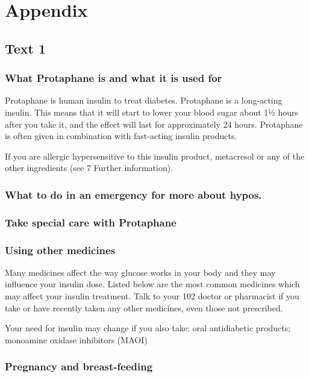 \documentclass[output=paper]{langsci/langscibook}
\begin{document}
\section{Appendix}

\subsection*{Text 1}

\subsubsection*{What Protaphane is and what it is used for}

Protaphane is human insulin to treat diabetes. Protaphane is a long-acting insulin. This means that it will start to lower your blood sugar about 1½ hours after you take it, and the effect will last for approximately 24 hours. Protaphane is often given in combination with fast-acting insulin products.

If you are allergic hypersensitive to this insulin product, metacresol or any of the other ingredients (see 7 Further information). 

\subsubsection*{What to do in an emergency for more about hypos.}

\subsubsection*{Take special care with Protaphane}

\subsubsection*{Using other medicines}

Many medicines affect the way glucose works in your body and they may influence your insulin dose. Listed below are the most common medicines which may affect your insulin treatment. Talk to your 102 doctor or pharmacist if you take or have recently taken any other medicines, even those not prescribed. 

Your need for insulin may change if you also take: oral antidiabetic products; monoamine oxidase inhibitors (MAOI)

\subsubsection*{Pregnancy and breast-feeding}
\end{document}
